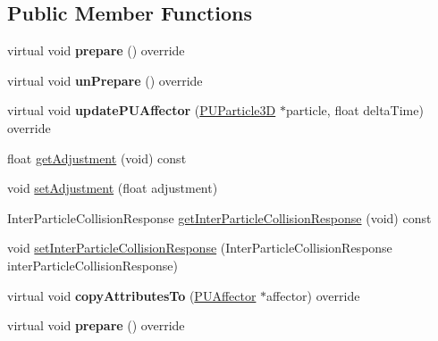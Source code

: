 \subsection*{Public Member Functions}
\begin{DoxyCompactItemize}
\item 
\mbox{\label{classPUParticle3DInterParticleCollider_a7900ca037d54bc13f2c9d3c73b4a33b6}} 
virtual void {\bfseries prepare} () override
\item 
\mbox{\label{classPUParticle3DInterParticleCollider_acf65df6970ffb36f93a74a1015a13183}} 
virtual void {\bfseries un\+Prepare} () override
\item 
\mbox{\label{classPUParticle3DInterParticleCollider_abbf7583bcb2635d86cfbd0ce57398126}} 
virtual void {\bfseries update\+P\+U\+Affector} (\hyperlink{structPUParticle3D}{P\+U\+Particle3D} $\ast$particle, float delta\+Time) override
\item 
float \hyperlink{classPUParticle3DInterParticleCollider_a7368e91519b1d0b86ab39e03454c3b93}{get\+Adjustment} (void) const
\item 
void \hyperlink{classPUParticle3DInterParticleCollider_a9b14f7d946c5129dec882a4bb39f47b4}{set\+Adjustment} (float adjustment)
\item 
Inter\+Particle\+Collision\+Response \hyperlink{classPUParticle3DInterParticleCollider_ae47b1bc35a2ebe20f8aeebcd0a4dad16}{get\+Inter\+Particle\+Collision\+Response} (void) const
\item 
void \hyperlink{classPUParticle3DInterParticleCollider_ad39dd75ace38589685b39329af1a38ea}{set\+Inter\+Particle\+Collision\+Response} (Inter\+Particle\+Collision\+Response inter\+Particle\+Collision\+Response)
\item 
\mbox{\label{classPUParticle3DInterParticleCollider_a305a11295b2260d830e37f9f0c0c6c07}} 
virtual void {\bfseries copy\+Attributes\+To} (\hyperlink{classPUAffector}{P\+U\+Affector} $\ast$affector) override
\item 
\mbox{\label{classPUParticle3DInterParticleCollider_a4912dd70b382ed090c783e8c54ca7492}} 
virtual void {\bfseries prepare} () override
\item 

\end{DoxyCompactItemize}
